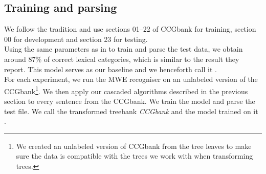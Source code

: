 \documentclass[output=paper]{langsci/langscibook}
\begin{document}
    \subsection{Training and parsing}
    \label{del:trainparse}
    \indent We follow the tradition and use sections 01--22 of CCGbank for training, section 00 for development and section 23 for testing.\\
    \indent Using the same parameters as in \citet{deoskar} to train and parse the test data, we obtain around 87\% of correct lexical categories, which is similar to the result they report. This model serves as our baseline and we henceforth call it {\modelA}.\\
    \indent For each experiment, we run the MWE recogniser on an unlabeled version of the CCGbank\footnote{We created an unlabeled version of CCGbank from the tree leaves to make sure the data is compatible with the trees we work with when transforming trees.}. We then apply our cascaded algorithms described in the previous section to every sentence from the CCGbank. We train the model and parse the test file. We call the transformed treebank \textit{CCGbank} and the model trained on it {\modelB}.
\end{document}
